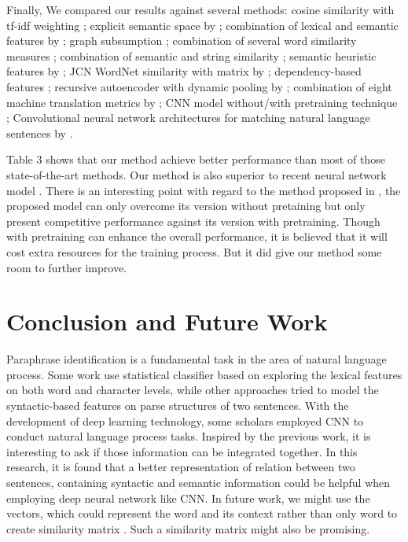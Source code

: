 \documentclass[conference]{IEEEtran}
\begin{document}
Finally, We compared our results against several methods: cosine similarity with tf-idf weighting \cite{DBLP:conf/aaai/MihalceaCS06}; explicit semantic space by \cite{hassan2011measuring}; combination of lexical and semantic features by \cite{DBLP:conf/fintal/KozarevaM06}; graph subsumption \cite{DBLP:conf/flairs/RusMLMG08}; combination of several word similarity measures \cite{DBLP:conf/aaai/MihalceaCS06}; combination of semantic and string similarity \cite{islam2009semantic}; semantic heuristic features by \cite{ul2012paraphrase}; JCN WordNet similarity with matrix by \cite{fernando2008semantic}; dependency-based features \cite{selfdef:conf/altw/WanDDP06}; recursive autoencoder with dynamic pooling by \cite{DBLP:conf/nips/SocherHPNM11}; combination of eight machine translation metrics by \cite{DBLP:conf/naacl/MadnaniTC12}; CNN model without/with pretraining technique \cite{DBLP:conf/naacl/YinS15}; Convolutional neural network architectures for matching natural language sentences by \cite{DBLP:conf/nips/HuLLC14, DBLP:conf/aaai/PangLGXWC16}.

Table 3 shows that our method achieve better performance than most of those state-of-the-art methods. Our method is also superior to recent neural network model \cite{DBLP:conf/nips/HuLLC14, DBLP:conf/aaai/PangLGXWC16}. There is an interesting point with regard to the method proposed in \cite{DBLP:conf/naacl/YinS15}, the proposed model can only overcome its version without pretaining but only present competitive performance against its version with pretraining. Though with pretraining can enhance the overall performance, it is believed that it will cost extra resources for the training process. But it did give our method some room to further improve.



\section{Conclusion and Future Work}
Paraphrase identification is a fundamental task in the area of natural language process. Some work use statistical classifier based on exploring the lexical features on both word and character levels, while other approaches tried to model the syntactic-based features on parse structures of two sentences. With the development of deep learning technology, some scholars employed CNN to conduct natural language process tasks. Inspired by the previous work, it is interesting to ask if those information can be integrated together. In this research, it is found that a better representation of relation between two sentences, containing syntactic and semantic information could be helpful when employing deep neural network like CNN. In future work, we might use the vectors, which could represent the word and its context rather than only word to create similarity matrix \cite{DBLP:conf/conll/MelamudGD16}. Such a similarity matrix might also be promising.
\end{document}
